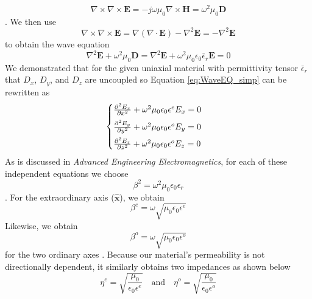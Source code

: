 \documentclass{optica-article}
\newcommand{\bv}[1]{\mathbf{#1}}
\begin{document}
\begin{equation}\label{eq:WaveEQ}
    \nabla \times \nabla \times \bv{E} = 
    -j\omega \mu_0 \nabla \times \bv{H} = 
\omega^2\mu_0 \bv{D}
\end{equation}
\cite{Balanis-2012, Wav_anis}. We then use
$$
\nabla \times \nabla \times \bv{E} = \nabla(\nabla\cdot \bv{E}) - \nabla^2\bv{E}
= - \nabla^2\bv{E}
$$
to obtain the wave equation
\begin{equation}\label{eq:WaveEQ_simp}
    \nabla^2 \bv{E} + \omega^2\mu_0 \bv{D}
    = \nabla^2 \bv{E} + \omega^2\mu_0\epsilon_0 \bar{\epsilon}_r \bv{E} = 0
\end{equation}
We demonstrated that for the given uniaxial material with permittivity tensor
$\bar{\epsilon}_r$ that $D_x$, $D_y$, and $D_z$ are uncoupled so Equation 
\eqref{eq:WaveEQ_simp} can be rewritten as
\begin{equation}\label{eq:WaveEQ-xyz}
  \begin{cases}
    \vspace{0.5em}
    \partialderivative{^2E_x}{x^2} + \omega^2\mu_0\epsilon_0\epsilon^e E_x = 0\\
    \vspace{0.5em}
    \partialderivative{^2E_y}{y^2} + \omega^2\mu_0\epsilon_0\epsilon^o E_y = 0\\
    \partialderivative{^2E_z}{z^2} + \omega^2\mu_0\epsilon_0\epsilon^o E_z = 0\\
  \end{cases}
\end{equation}
As is discussed in \textit{Advanced Engineering Electromagnetics}, for each of
these independent equations we choose
$$
\beta^2 = \omega^2\mu_0\epsilon_0\epsilon_r
$$
\cite{Balanis-2012}.
For the extraordinary axis ($\bv{\hat{x}}$), we obtain
\begin{equation}\label{eq:beta_e}
\beta^e = \omega\sqrt{\mu_0\epsilon_0\epsilon^e}
\end{equation}
Likewise, we obtain
\begin{equation}\label{eq:beta_o}
  \beta^o = \omega\sqrt{\mu_0\epsilon_0\epsilon^o}
\end{equation}
for the two ordinary axes \cite{Balanis-2012, Wav_anis}. Because our material's
permeability is not directionally dependent, it similarly obtains two 
impedances as shown below
\begin{equation}\label{eq:imped}
  \eta^e = \sqrt{\frac{\mu_0}{\epsilon_0\epsilon^e}}
  \quad\mathrm{and}\quad
  \eta^o = \sqrt{\frac{\mu_0}{\epsilon_0\epsilon^o}}
\end{equation}
\end{document}
